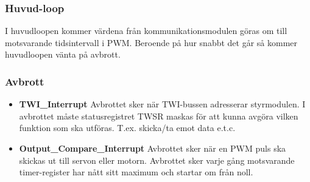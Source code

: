 \documentclass[designspec/spec.tex]{subfiles}
\begin{document}
\subsubsection{Huvud-loop}
I huvudloopen kommer värdena från kommunikationsmodulen göras om till
motsvarande tidsintervall i PWM. Beroende på hur snabbt det går så kommer
huvudloopen vänta på avbrott.

\subsubsection{Avbrott}
\begin{itemize}
	\item \textbf{TWI\_Interrupt} Avbrottet sker när TWI-bussen adresserar
	styrmodulen. I avbrottet måste statusregistret TWSR maskas för att kunna
	avgöra vilken funktion som ska utföras. T.ex. skicka/ta emot data e.t.c. 

	\item \textbf{Output\_Compare\_Interrupt} Avbrottet sker när en PWM puls
	ska skickas ut till servon eller motorn. Avbrottet sker varje gång
	motsvarande timer-register har nått sitt maximum och startar om från noll.
\end{itemize}
\end{document}
